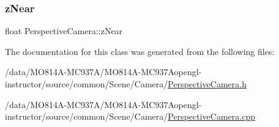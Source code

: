\subsubsection{\texorpdfstring{z\+Near}{zNear}}
{\footnotesize\ttfamily float Perspective\+Camera\+::z\+Near\hspace{0.3cm}{\ttfamily [private]}}



The documentation for this class was generated from the following files\+:\begin{DoxyCompactItemize}
\item
/data/MO814A-MC937A/MO814A-MC937Aopengl-\/instructor/source/common/\+Scene/\+Camera/\hyperlink{_perspective_camera_8h}{Perspective\+Camera.\+h}\item
/data/MO814A-MC937A/MO814A-MC937Aopengl-\/instructor/source/common/\+Scene/\+Camera/\hyperlink{_perspective_camera_8cpp}{Perspective\+Camera.\+cpp}\end{DoxyCompactItemize}
